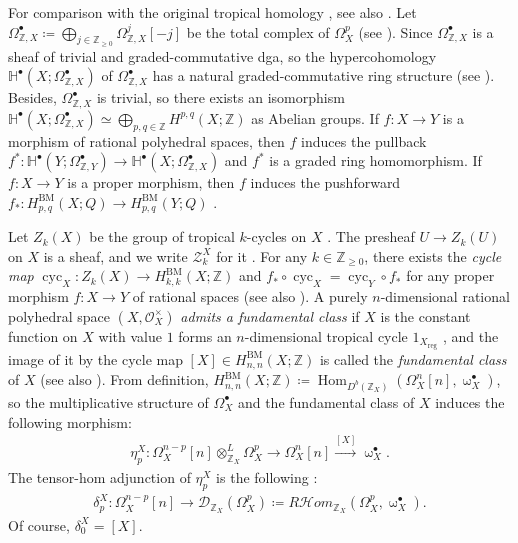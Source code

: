 \documentclass[a4paper,dvipdfmx,reqno,12pt]{amsart}
\theoremstyle{definition}
\newcommand{\deq}{\coloneqq}
\newcommand{\opn}[1]{\operatorname{#1}}
\newcommand{\xto}[1]{\xrightarrow{#1}}
\numberwithin{equation}{section}
\begin{document}
For comparison with the original
tropical homology \cite{MR3330789,MR3961331},
see also \cite[Remark 2.8 and Theorem 4.20]{MR4637248}.
Let $\Omega_{\mathbb{Z},X}^{\bullet}
\deq \bigoplus_{j\in \mathbb{Z}_{\geq 0}}
\Omega_{\mathbb{Z},X}^{j}[-j]$ 
be the total complex of 
$\Omega_{X}^{p}$ 
(see \cite[Proposition 3.1]{smacka2017differential}).
Since $\Omega_{\mathbb{Z},X}^{\bullet}$ is a sheaf
of trivial and graded-commutative dga, so the
hypercohomology 
$\mathbb{H}^{\bullet}(X;\Omega_{\mathbb{Z},X}^{\bullet})$
of $\Omega_{\mathbb{Z},X}^{\bullet}$ has
a natural graded-commutative ring structure
(see \cite[Remark 21.130]{gortzwedhorn2023}).
Besides, $\Omega_{\mathbb{Z},X}^{\bullet}$ is trivial,
so there exists an isomorphism
$\mathbb{H}^{\bullet}(X;\Omega_{\mathbb{Z},X}^{\bullet})
\simeq \bigoplus_{p,q\in \mathbb{Z}}
H^{p,q}(X;\mathbb{Z})$ as Abelian groups.
If $f\colon X\to Y$ is a morphism of
rational polyhedral spaces, then
$f$ induces the pullback
$f^{*}\colon \mathbb{H}^{\bullet}(Y;\Omega_{\mathbb{Z},Y}^{\bullet})
\to \mathbb{H}^{\bullet}(X;\Omega_{\mathbb{Z},X}^{\bullet})$
\cite[Proposition 4.18]{MR4637248} and $f^{*}$ is
a graded ring homomorphism.
If $f\colon X\to Y$ is a proper morphism, then
$f$ induces the pushforward 
$f_*\colon H^{\opn{BM}}_{p,q}(X;Q)\to 
H^{\opn{BM}}_{p,q}(Y;Q)$ \cite[Definition 4.9]{MR4637248}.

Let $Z_k(X)$ be the group of tropical $k$-cycles
on $X$ \cite[Definition 3.5]{MR4637248}.
The presheaf $U\to Z_k(U)$ on $X$ is a sheaf,
and we write $\mathscr{Z}_k^{X}$ for it
\cite[p.591]{MR4637248}.
For any $k\in \mathbb{Z}_{\geq 0}$, there
exists the \emph{cycle map}
$\opn{cyc}_X \colon Z_k(X)\to 
H^{\mathrm{BM}}_{k,k}(X;\mathbb{Z})$
and $f_*\circ \opn{cyc}_X=\opn{cyc}_Y \circ f_*$
for any proper morphism $f\colon X\to Y$ of rational
spaces \cite[Definition 5.4 and Corollary 5.8]{MR4637248}
(see also \cite[Definition 4.13]{MR3894860}).
A purely $n$-dimensional rational polyhedral space
$(X,\mathcal{O}_X^{\times})$
\emph{admits a fundamental class} if
$X$ is the constant function on 
$X$ with value $1$ forms
an $n$-dimensional tropical cycle
$1_{X_{\mathrm{reg}}}$
\cite[]{MR4637248},
and the image of it by the cycle map
$[X]\in H_{n,n}^{\mathrm{BM}}(X;\mathbb{Z})$ 
is called the \emph{fundamental class} of $X$
(see also \cite[Definition 4.8]{MR3894860}).
From definition,
$H_{n,n}^{\mathrm{BM}}
(X;\mathbb{Z})\deq \opn{Hom}_{D^{b}(\mathbb{Z}_X)}
(\Omega_{X}^{n}[n],\upomega_{X}^{\bullet})$, so
the multiplicative structure of $\Omega_X^{\bullet}$
and the fundamental class of $X$ induces
the following morphism:
\begin{align}
\eta_{p}^{X}\colon \Omega_X^{n-p}[n]\otimes^{L}_{\mathbb{Z}_X}
\Omega_X^{p} \to \Omega_X^{n}[n] \xto{[X]}
\upomega_X^{\bullet}. 	
\end{align}
The tensor-hom adjunction of $\eta_{p}^{X}$ is
the following \cite[p.627]{MR4637248}:
\begin{align}
\delta_p^{X}\colon \Omega_X^{n-p}[n]\to 
\mathcal{D}_{\mathbb{Z}_X}(\Omega_X^{p})
\deq R\mathcal{H}om_{\mathbb{Z}_X}(\Omega_X^{p},
\upomega_X^{\bullet}).
\end{align}
Of course, $\delta_0^{X}=[X]$.
\end{document}
